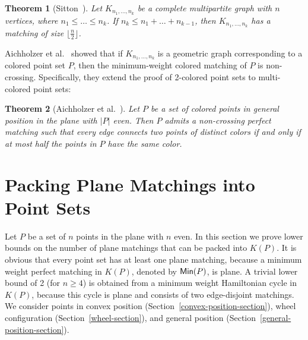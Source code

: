 \documentclass[11pt,a4paper]{article}
\newcommand{\Kn}[1]{K#1}
\newtheorem{theorem}{Theorem}
\begin{document}
\begin{theorem}[Sitton~\cite{Sitton1996}]
\label{Sitton}
Let $K_{n_1,\dots,n_k}$ be a complete multipartite graph with $n$ vertices, where $n_1\le\dots\le n_k$. If $n_k\allowbreak \le \allowbreak n_1+\dots+\allowbreak n_{k-1}$, then $K_{n_1,\dots,n_k}$ has a matching of size $\lfloor\frac{n}{2}\rfloor$. 
\end{theorem}

Aichholzer et al.~\cite{Aichholzer2010} showed that if $K_{n_1,\dots,n_k}$ is a geometric graph corresponding to a colored point set $P$, then the minimum-weight colored matching of $P$ is non-crossing. Specifically, they extend the proof of 2-colored point sets to multi-colored point sets:

\begin{theorem}[Aichholzer et al.~\cite{Aichholzer2010}]
\label{Aichholzer}
Let $P$ be a set of colored points in general position in the plane with $|P|$ even. Then $P$
admits a non-crossing perfect matching such that every edge connects two points of distinct colors if and only if at most half the points in $P$ have the same color.
\end{theorem}


\section{Packing Plane Matchings into Point Sets}
\label{edge-disjoint-plane-section}
Let $P$ be a set of $n$ points in the plane with $n$ even. In this section we prove lower bounds on the number of plane matchings that can be packed into $\Kn{(P)}$. It is obvious that every point set has at least one plane matching, because a minimum weight perfect matching in $\Kn{(P)}$, denoted by ${\sf Min}(P)$, is plane. A trivial lower bound of 2 (for $n\ge4$) is obtained from a minimum weight Hamiltonian cycle in $\Kn{(P)}$, because this cycle is plane and consists of two edge-disjoint matchings. We consider points in convex position (Section~\ref{convex-position-section}), wheel configuration (Section~\ref{wheel-section}), and general position (Section~\ref{general-position-section}). 
\end{document}

